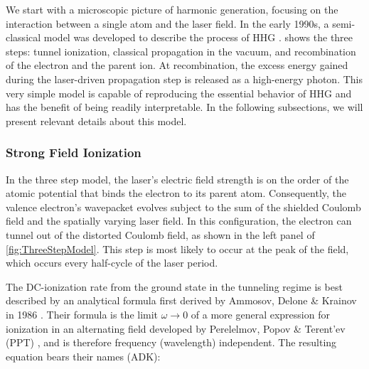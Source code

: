 We start with a microscopic picture of harmonic generation, focusing on the interaction between a single atom and the laser field. In the early 1990s, a semi-classical model was developed to describe the process of HHG \cite{schaferThresholdIonizationHigh1993,corkumPlasmaPerspectiveStrong1993}.  shows the three steps: tunnel ionization, classical propagation in the vacuum, and recombination of the electron and the parent ion. At recombination, the excess energy gained during the laser-driven propagation step is released as a high-energy photon. This very simple model is capable of reproducing the essential behavior of HHG and has the benefit of being readily interpretable. In the following subsections, we will present relevant details about this model.

\subsubsection{Strong Field Ionization}

In the three step model, the laser's electric field strength is on the order of the atomic potential that binds the electron to its parent atom. Consequently, the valence electron's wavepacket evolves subject to the sum of the shielded Coulomb field and the spatially varying laser field. In this configuration, the electron can tunnel out of the distorted Coulomb field, as shown in the left panel of \cref{fig:ThreeStepModel}. This step is most likely to occur at the peak of the field, which occurs every half-cycle of the laser period.

The DC-ionization rate from the ground state in the tunneling regime is best described by an analytical formula first derived by Ammosov, Delone \& Krainov in 1986 \cite{ammosovTunnelIonizationComplex1986,changFundamentalsAttosecondOptics2011,laiExperimentalInvestigationStrongfieldionization2017}. Their formula is the limit $\omega \rightarrow 0$ of a more general expression for ionization in an alternating field developed by Perelelmov, Popov \& Terent'ev (PPT) \cite{perelomovIONIZATIONATOMSALTERNATING1966}, and is therefore frequency (wavelength) independent. The resulting equation bears their names (ADK):


